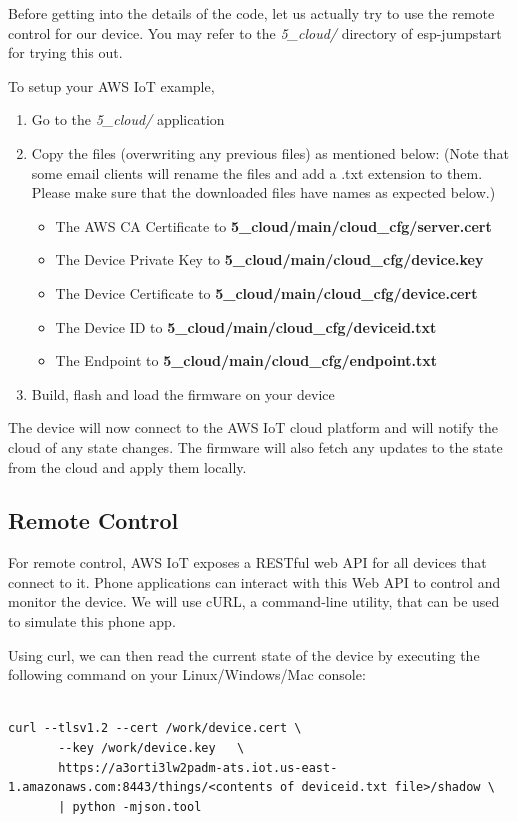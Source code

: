 \documentclass[main.tex]{subfiles}
\begin{document}
Before getting into the details of the code, let us actually try to use the remote control for our device.
You may refer to the \textit{5\_cloud/} directory of esp-jumpstart for trying this out.

To setup your AWS IoT example, 
\begin{enumerate}
    \item Go to the \textit{5\_cloud/} application
    \item Copy the files (overwriting any previous files) as mentioned below: (Note that some email clients will rename the files and add a .txt extension to them. Please make sure that the downloaded files have names as expected below.)
    \begin{itemize}
        \item The AWS CA Certificate to \textbf{5\_cloud/main/cloud\_cfg/server.cert}
        \item The Device Private Key to \textbf{5\_cloud/main/cloud\_cfg/device.key}
        \item The Device Certificate to \textbf{5\_cloud/main/cloud\_cfg/device.cert}
        \item The Device ID to \textbf{5\_cloud/main/cloud\_cfg/deviceid.txt}
        \item The Endpoint to \textbf{5\_cloud/main/cloud\_cfg/endpoint.txt}
    \end{itemize}
    \item Build, flash and load the firmware on your device
\end{enumerate}

The device will now connect to the AWS IoT cloud platform and will notify the cloud of any state changes. The firmware will also fetch any updates to the state from the cloud and apply them locally. 

\subsection{Remote Control}
For remote control, AWS IoT exposes a RESTful web API for all devices that connect to it. Phone applications can interact with this Web API to control and monitor the device. We will use cURL, a command-line utility, that can be used to simulate this phone app. 

Using curl, we can then read the current state of the device by executing the following command on your Linux/Windows/Mac console:
\begin{verbatim}

curl --tlsv1.2 --cert /work/device.cert \
       --key /work/device.key   \
       https://a3orti3lw2padm-ats.iot.us-east-1.amazonaws.com:8443/things/<contents of deviceid.txt file>/shadow \ 
       | python -mjson.tool

\end{verbatim}
\end{document}

